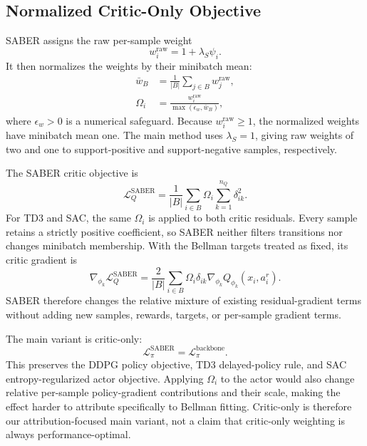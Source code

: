 \documentclass[letterpaper]{article}
\begin{document}
\subsection{Normalized Critic-Only Objective}

SABER assigns the raw per-sample weight
\begin{equation}
w_i^{\mathrm{raw}}=1+\lambda_S\psi_i.
\end{equation}
It then normalizes the weights by their minibatch mean:
\begin{align}
\bar w_B&=\frac{1}{|B|}\sum_{j\in B}w_j^{\mathrm{raw}},\\
\Omega_i&=\frac{w_i^{\mathrm{raw}}}{\max(\epsilon_w,\bar w_B)},
\end{align}
where \(\epsilon_w>0\) is a numerical safeguard. Because \(w_i^{\mathrm{raw}}\geq1\), the normalized weights have minibatch mean one. The main method uses \(\lambda_S=1\), giving raw weights of two and one to support-positive and support-negative samples, respectively.

The SABER critic objective is
\begin{equation}
\mathcal{L}_{Q}^{\mathrm{SABER}}
=\frac{1}{|B|}
\sum_{i\in B}
\Omega_i
\sum_{k=1}^{n_Q}
\delta_{ik}^{2}.
\end{equation}
For TD3 and SAC, the same \(\Omega_i\) is applied to both critic residuals. Every sample retains a strictly positive coefficient, so SABER neither filters transitions nor changes minibatch membership. With the Bellman targets treated as fixed, its critic gradient is
\begin{equation}
\nabla_{\phi_k}\mathcal{L}_{Q}^{\mathrm{SABER}}
=\frac{2}{|B|}
\sum_{i\in B}
\Omega_i\delta_{ik}
\nabla_{\phi_k}Q_{\phi_k}(x_i,a_i^r).
\end{equation}
SABER therefore changes the relative mixture of existing residual-gradient terms without adding new samples, rewards, targets, or per-sample gradient terms.

The main variant is critic-only:
\begin{equation}
\mathcal{L}_{\pi}^{\mathrm{SABER}}
=\mathcal{L}_{\pi}^{\mathrm{backbone}}.
\end{equation}
This preserves the DDPG policy objective, TD3 delayed-policy rule, and SAC entropy-regularized actor objective. Applying \(\Omega_i\) to the actor would also change relative per-sample policy-gradient contributions and their scale, making the effect harder to attribute specifically to Bellman fitting. Critic-only is therefore our attribution-focused main variant, not a claim that critic-only weighting is always performance-optimal.
\end{document}
